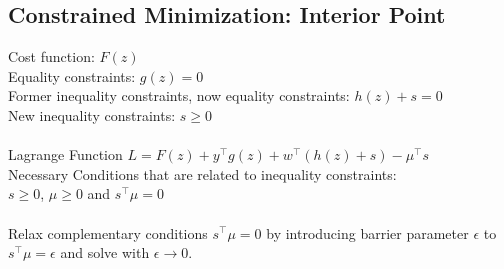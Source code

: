 \documentclass[english]{latex4ei/latex4ei_sheet}
\begin{document}
\begin{sectionbox}
\subsection{Constrained Minimization: Interior Point}
Cost function: $F(z)$\\
Equality constraints: $g(z)=0$\\
Former inequality constraints, now equality constraints: $h(z)+s=0$\\
New inequality constraints: $s\geq 0$\\
\\
Lagrange Function $L=F(z)+y^{\top}g(z)+w^{\top}(h(z)+s)-\mu^{\top}s$\\
Necessary Conditions that are related to inequality constraints:\\
$s \geq 0 $, $\mu \geq 0$ and $s^{\top}\mu=0$\\
\\
Relax complementary conditions $s^{\top}\mu=0$ by introducing barrier parameter $\epsilon$ to $s^{\top}\mu=\epsilon$ and solve with $\epsilon \rightarrow 0$.
\end{sectionbox}
\end{document}
